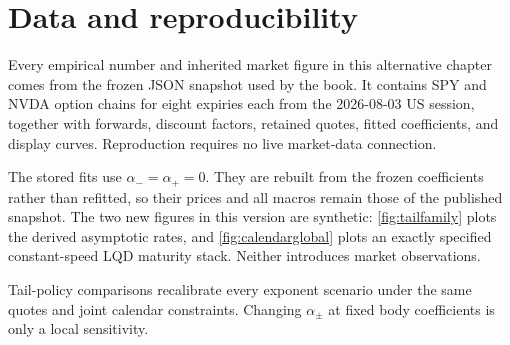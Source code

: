 \section{Data and reproducibility}
\label{app:data}

Every empirical number and inherited market figure in this alternative chapter
comes from the frozen JSON snapshot used by the book.  It contains SPY and
NVDA option chains for eight expiries each from the 2026-08-03 US session,
together with forwards, discount factors, retained quotes, fitted coefficients,
and display curves.  Reproduction requires no live market-data connection.

The stored fits use $\alpha_-=\alpha_+=0$.  They are rebuilt from the frozen
coefficients rather than refitted, so their prices and all macros remain those
of the published snapshot.  The two new figures in this version are synthetic:
\cref{fig:tailfamily} plots the derived asymptotic rates, and
\cref{fig:calendarglobal} plots an exactly specified constant-speed LQD
maturity stack.  Neither introduces market observations.

Tail-policy comparisons recalibrate every exponent scenario under the same
quotes and joint calendar constraints.  Changing $\alpha_\pm$ at fixed body
coefficients is only a local sensitivity.
